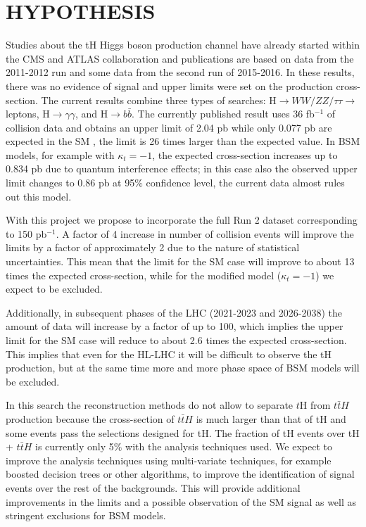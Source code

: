 \documentclass[final,3p]{CSP}
\begin{document}
\section{HYPOTHESIS}

\onehalfspacing Studies about the tH Higgs boson production channel have already started within the CMS and ATLAS collaboration and publications are based on data from the 2011-2012 run and some data from the second run of 2015-2016.
In these results, there was no evidence of signal and upper limits were set on the production cross-section.
The current results combine three types of searches: H$\rightarrow WW/ZZ/\tau\tau \rightarrow$leptons, H$\rightarrow\gamma\gamma$, and H$\rightarrow b\bar{b}$.
The currently published result uses 36 fb$^{-1}$ of collision data and obtains an upper limit of 2.04 pb while only 0.077 pb are expected in the SM \cite{sirunyan2019search}, the limit is 26 times larger than the expected value.
In BSM models, for example with $\kappa_t = -1$,  the expected cross-section increases up to 0.834 pb due to quantum interference effects; in this case also the observed upper limit changes to 0.86 pb at 95$\%$ confidence level, the current data almost rules out this model.  

With this project we propose to incorporate the full Run 2 dataset corresponding to 150 pb$^{-1}$.
A factor of 4 increase in number of collision events will improve the limits by a factor of approximately 2 due to the nature of statistical uncertainties.
This mean that the limit for the SM case will improve to about 13 times the expected cross-section, while for the modified model ($\kappa_t = -1$) we expect to be excluded.

Additionally, in subsequent phases of the LHC (2021-2023 and 2026-2038) the amount of data will increase by a factor of up to 100, which implies the upper limit for the SM case will reduce to about 2.6 times the expected cross-section. This implies that even for the HL-LHC it will be difficult to observe the tH production, but at the same time more and more phase space of BSM models will be excluded.  

In this search the reconstruction methods do not allow to separate $t$H from $t\bar{t}H$ production because the cross-section of $t\bar{t}H$ is much larger than that of tH and some events pass the selections designed for tH.
The fraction of tH events over tH + $t\bar{t}H$ is currently only 5$\%$ with the analysis techniques used.
We expect to improve the analysis techniques using multi-variate techniques, for example boosted decision trees or other algorithms, to improve the identification of signal events over the rest of the backgrounds.
This will provide additional improvements in the limits and a possible observation of the SM signal as well as stringent exclusions for BSM models.
\end{document}
